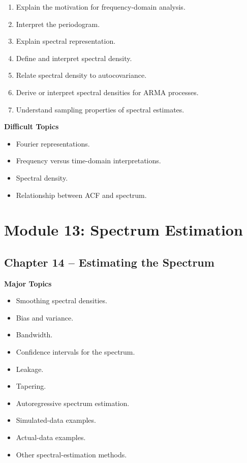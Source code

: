 \documentclass[11pt,a4paper]{article}
\begin{document}
\begin{enumerate}
    \item Explain the motivation for frequency-domain analysis.
    \item Interpret the periodogram.
    \item Explain spectral representation.
    \item Define and interpret spectral density.
    \item Relate spectral density to autocovariance.
    \item Derive or interpret spectral densities for ARMA processes.
    \item Understand sampling properties of spectral estimates.
\end{enumerate}

\textbf{Difficult Topics}

\begin{itemize}
    \item Fourier representations.
    \item Frequency versus time-domain interpretations.
    \item Spectral density.
    \item Relationship between ACF and spectrum.
\end{itemize}

\section{Module 13: Spectrum Estimation}

\subsection{Chapter 14 -- Estimating the Spectrum}

\textbf{Major Topics}

\begin{itemize}
    \item Smoothing spectral densities.
    \item Bias and variance.
    \item Bandwidth.
    \item Confidence intervals for the spectrum.
    \item Leakage.
    \item Tapering.
    \item Autoregressive spectrum estimation.
    \item Simulated-data examples.
    \item Actual-data examples.
    \item Other spectral-estimation methods.
\end{itemize}
\end{document}
